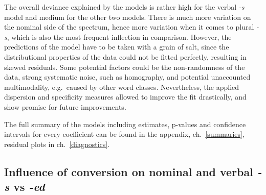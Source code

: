 \documentclass[
]{article}
\begin{document}
The overall deviance explained by the models is rather high for the
verbal \emph{-s} model and medium for the other two models. There is
much more variation on the nominal side of the spectrum, hence more
variation when it comes to plural \emph{-s}, which is also the most
frequent inflection in comparison. However, the predictions of the model
have to be taken with a grain of salt, since the distributional
properties of the data could not be fitted perfectly, resulting in
skewed residuals. Some potential factors could be the non-randomness of
the data, strong systematic noise, such as homography, and potential
unaccounted multimodality, e.g.~caused by other word classes.
Nevertheless, the applied dispersion and specificity measures allowed to
improve the fit drastically, and show promise for future improvements.

The full summary of the models including estimates, p-values and
confidence intervals for every coefficient can be found in the appendix,
ch.~\ref{summaries}, residual plots in ch.~\ref{diagnostics}.

\hypertarget{influence-of-conversion-on-nominal-and-verbal--s-vs--ed}{%
\subsection{\texorpdfstring{Influence of conversion on nominal and
verbal \emph{-s} vs
\emph{-ed}}{Influence of conversion on nominal and verbal -s vs -ed}}\label{influence-of-conversion-on-nominal-and-verbal--s-vs--ed}}
\end{document}
